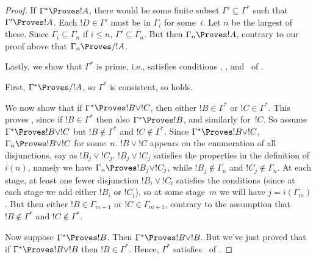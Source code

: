 \documentclass[../../../include/open-logic-section]{subfiles}
\begin{document}
\begin{proof}
  If $\Gamma^* \Proves !A$, there would be some finite subset $\Gamma'
  \subseteq \Gamma^*$ such that $\Gamma' \Proves !A$. Each $!D \in
  \Gamma'$ must be in $\Gamma_i$ for some~$i$.  Let $n$ be the largest
  of these. Since $\Gamma_i \subseteq \Gamma_n$ if $i \le n$, $\Gamma'
  \subseteq \Gamma_n$. But then $\Gamma_n \Proves !A$, contrary to our
  proof above that $\Gamma_n \Proves/ !A$.

  Lastly, we show that $\Gamma^*$ is prime, i.e., satisfies conditions
  , , and~ of
  .

  First, $\Gamma^* \Proves/ !A$, so $\Gamma^*$ is
  consistent, so  holds.

  We now show that if $\Gamma^* \Proves !B \lor !C$, then either $!B
  \in \Gamma^*$ or $!C \in \Gamma^*$. This proves ,
  since if $!B \in \Gamma^*$ then also $\Gamma^* \Proves !B$, and
  similarly for~$!C$. So assume $\Gamma^* \Proves !B \lor !C$ but $!B
  \notin \Gamma^*$ and $!C \notin \Gamma^*$. Since $\Gamma^* \Proves
  !B \lor !C$, $\Gamma_n \Proves !B \lor !C$ for some~$n$. $!B \lor
  !C$ appears on the enumeration of all disjunctions, say as $!B_j
  \lor !C_j$. $!B_j \lor !C_j$ satisfies the properties in the
  definition of $i(n)$, namely we have $\Gamma_n \Proves !B_j
  \lor !C_j$, while $!B_j \notin \Gamma_n$ and $!C_j \notin \Gamma_n$. At
  each stage, at least one fewer disjunction $!B_i \lor !C_i$
  satisfies the conditions (since at each stage we add either $!B_i$
  or $!C_i$), so at some stage~$m$ we will have $j = i(\Gamma_m)$. But
  then either $!B \in \Gamma_{m+1}$ or $!C \in \Gamma_{m+1}$, contrary
  to the assumption that $!B \notin \Gamma^*$ and $!C \notin
  \Gamma^*$.

  Now suppose $\Gamma^* \Proves !B$. Then $\Gamma^* \Proves !B \lor
  !B$. But we've just proved that if $\Gamma^* \Proves !B \lor !B$
  then $!B \in \Gamma^*$. Hence, $\Gamma^*$
  satisfies~ of .
\end{proof}
\end{document}
